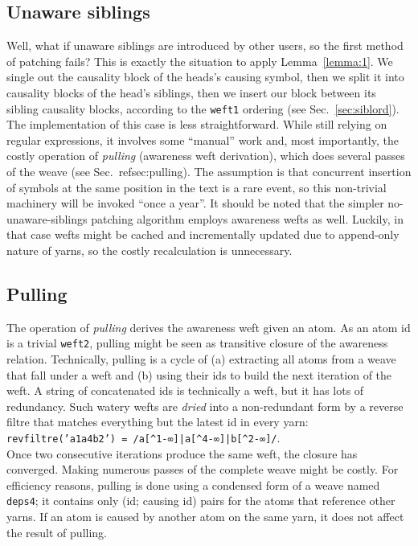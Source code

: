 \documentclass{acm_proc_article-sp}
\begin{document}
\subsection{Unaware siblings} \label{sec:unre}

Well, what if unaware siblings are introduced by other users, so the first method of patching fails?
This is exactly the situation to apply Lemma~\ref{lemma:1}. 
We single out the causality block of the heads's causing symbol, then we split it into causality blocks of the head's siblings, then we insert our block between its sibling causality blocks, according to the {\tt weft1} ordering (see Sec.~\ref{sec:siblord}).
The implementation of this case is less straightforward.
While still relying on regular expressions, it involves some ``manual'' work and, most importantly, the costly operation of \emph{pulling} (awareness weft derivation), which does several passes of the weave (see Sec.~ref{sec:pulling}).
The assumption is that concurrent insertion of symbols at the same position in the text is a rare event, so this non-trivial machinery will be invoked ``once a year''.
It should be noted that the simpler no-unaware-siblings patching algorithm employs awareness wefts as well.
Luckily, in that case wefts might be cached and incrementally updated due to append-only nature of yarns, so the costly recalculation is unnecessary.

\subsection{Pulling} \label{sec:pulling}

The operation of \emph{pulling} derives the awareness weft given an atom.
As an atom id is a trivial {\tt weft2}, pulling might be seen as transitive closure of the awareness relation.
Technically, pulling is a cycle of (a) extracting all atoms from a weave that fall under a weft and (b) using their ids to build the next iteration of the weft.
A string of concatenated ids is technically a weft, but it has lots of redundancy.
Such watery wefts are \emph{dried} into a non-redundant form by a reverse filtre that matches everything but the latest id in every yarn:
{\tt revfiltre('a1a4b2') = \verb+/a[^1-∞]|a[^4-∞]|b[^2-∞]/+}.\\
Once two consecutive iterations produce the same weft, the closure has converged.
Making numerous passes of the complete weave might be costly.
For efficiency reasons, pulling is done using a condensed form of a weave named {\tt deps4}; it contains only (id; causing id) pairs for the atoms that reference other yarns.
If an atom is caused by another atom on the same yarn, it does not affect the result of pulling. 
\end{document}
